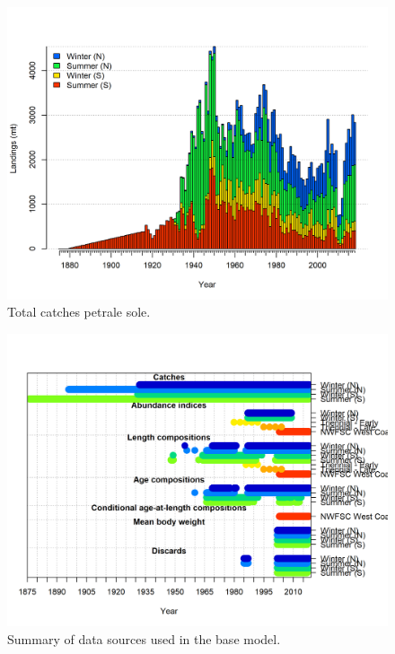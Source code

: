 \documentclass[12pt,]{article}
\begin{document}
\begin{figure}
\centering
\includegraphics{r4ss/plots_mod1/catch2 landings stacked.png}
\caption{Total catches petrale sole. \label{fig:Catch}}
\end{figure}

\FloatBarrier

\begin{figure}
\centering
\includegraphics{r4ss/plots_mod1/data_plot.png}
\caption{Summary of data sources used in the base model.
\label{fig:data_plot}}
\end{figure}

\FloatBarrier
\end{document}
